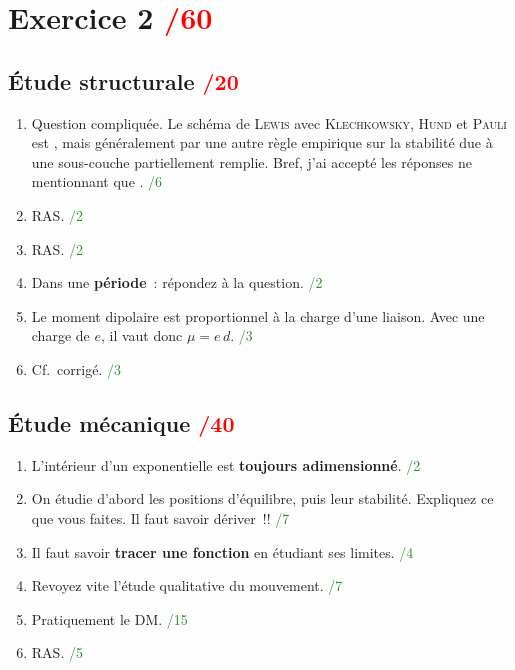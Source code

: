 \documentclass[a4paper, 10pt, final, garamond]{book}
\begin{document}
\section{Exercice 2 \hfill \textcolor{red}{/60}}
\begin{multicols}{2}
\subsection{Étude structurale \hfill \textcolor{red}{/20}}
\begin{enumerate}
    \item Question compliquée. Le schéma de \textsc{Lewis} avec
        \textsc{Klechkowsky}, \textsc{Hund} et \textsc{Pauli} est
        \quad{}\quad, mais généralement  par une
        autre règle empirique sur la stabilité due à une sous-couche
        partiellement remplie. Bref, j'ai accepté les réponses ne mentionnant
        que .
        \hfill \textcolor{ForestGreen}{/6}
    \item RAS.
        \hfill \textcolor{ForestGreen}{/2}
    \item RAS.
        \hfill \textcolor{ForestGreen}{/2}
    \item Dans une \textbf{période}~: répondez à la question.
        \hfill \textcolor{ForestGreen}{/2}
    \item Le moment dipolaire est proportionnel à la charge d'une liaison. Avec
        une charge de $e$, il vaut donc $\mu = e\, d$.
        \hfill \textcolor{ForestGreen}{/3}
    \item Cf.\ corrigé.
        \hfill \textcolor{ForestGreen}{/3}
\end{enumerate}
\columnbreak
\subsection{Étude mécanique \hfill \textcolor{red}{/40}}
\begin{enumerate}[resume]
    \item L'intérieur d'un exponentielle est \textbf{toujours adimensionné}.
        \hfill \textcolor{ForestGreen}{/2}
    \item On étudie d'abord les positions d'équilibre, puis leur stabilité.
        Expliquez ce que vous faites. Il faut savoir dériver~!! 
        \hfill \textcolor{ForestGreen}{/7}
    \item Il faut savoir \textbf{tracer une fonction} en étudiant ses limites.
        \hfill \textcolor{ForestGreen}{/4}
    \item Revoyez vite l'étude qualitative du mouvement.
        \hfill \textcolor{ForestGreen}{/7}
    \item Pratiquement le DM.
        \hfill \textcolor{ForestGreen}{/15}
    \item RAS.
        \hfill \textcolor{ForestGreen}{/5}
\end{enumerate}
\end{multicols}
\end{document}
